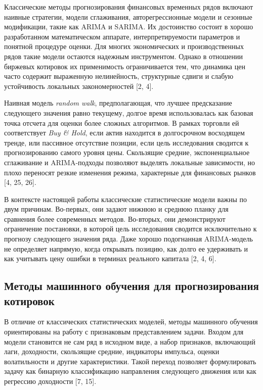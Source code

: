 Классические методы прогнозирования финансовых временных рядов включают наивные стратегии, модели сглаживания, авторегрессионные модели и сезонные модификации, такие как ARIMA и SARIMA. Их достоинство состоит в хорошо разработанном математическом аппарате, интерпретируемости параметров и понятной процедуре оценки. Для многих экономических и производственных рядов такие модели остаются надежным инструментом. Однако в отношении биржевых котировок их применимость ограничивается тем, что динамика цен часто содержит выраженную нелинейность, структурные сдвиги и слабую устойчивость локальных закономерностей [2, 4].

Наивная модель \textit{random walk}, предполагающая, что лучшее предсказание следующего значения равно текущему, долгое время использовалась как базовая точка отсчета для оценки более сложных алгоритмов. В рамках торговли ей соответствует \textit{Buy \& Hold}, если актив находится в долгосрочном восходящем тренде, или пассивное отсутствие позиции, если цель исследования сводится к прогнозированию самого уровня цены. Скользящие средние, экспоненциальное сглаживание и ARIMA-подходы позволяют выделять локальные зависимости, но плохо переносят резкие изменения режима, характерные для финансовых рынков [4, 25, 26].

В контексте настоящей работы классические статистические модели важны по двум причинам. Во-первых, они задают нижнюю и среднюю планку для сравнения более современных методов. Во-вторых, они демонстрируют ограничение постановки, в которой цель исследования сводится исключительно к прогнозу следующего значения ряда. Даже хорошо подогнанная ARIMA-модель не определяет напрямую, когда открывать позицию, как долго ее удерживать и как учитывать цену ошибки в терминах реального капитала [2, 4, 6].

\subsection{Методы машинного обучения для прогнозирования котировок}

В отличие от классических статистических моделей, методы машинного обучения ориентированы на работу с признаковым представлением задачи. Входом для модели становится не сам ряд в исходном виде, а набор признаков, включающий лаги, доходности, скользящие средние, индикаторы импульса, оценки волатильности и другие характеристики. Такой переход позволяет формулировать задачу как бинарную классификацию направления следующего движения или как регрессию доходности [7, 15].

